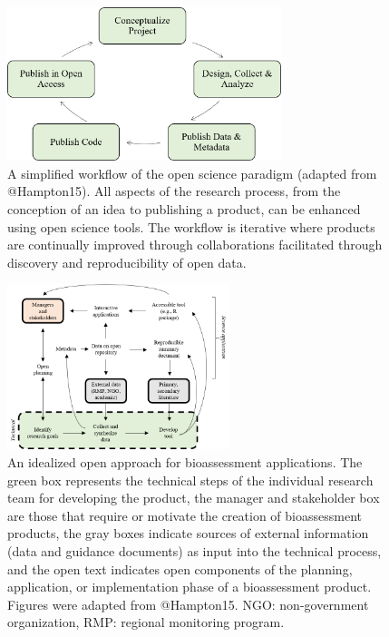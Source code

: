 \documentclass[fleqn,10pt,lineno]{wlpeerj} %
\begin{document}
\begin{figure}
\includegraphics[width=3.15in]{figs/basicflow} \caption{A simplified workflow of the open science paradigm (adapted from @Hampton15).  All aspects of the research process, from the conception of an idea to publishing a product, can be enhanced using open science tools.  The workflow is iterative where products are continually improved through collaborations facilitated through discovery and reproducibility of open data.}\label{fig:basicflow}
\end{figure}

\begin{figure}
\includegraphics[width=2.55in]{figs/open} \caption{An idealized open approach for bioassessment applications. The green box represents the technical steps of the individual research team for developing the product, the manager and stakeholder box are those that require or motivate the creation of bioassessment products, the gray boxes indicate sources of external information (data and guidance documents) as input into the technical process, and the open text indicates open components of the planning, application, or implementation phase of a bioassessment product. Figures were adapted from @Hampton15. NGO: non-government organization, RMP: regional monitoring program.}\label{fig:open}
\end{figure}
\end{document}
